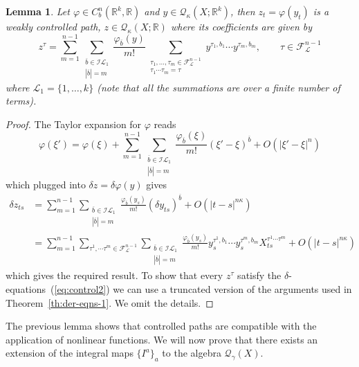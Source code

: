 \documentclass[a4paper,11pt,reqno]{article}
\newcommand{\ol}[1]{\overline{#1}}
\newcommand{\1}{{\bf 1}}
\newcommand{\II}{\mathcal{I}}
\newcommand{\der}{\delta}
\newcommand{\RR}{\mathbb{R}}
\newcommand{\FF}{\mathcal{F}}
\newcommand{\QQ}{\mathcal{Q}}
\newcommand{\LL}{\mathcal{L}}
\newcommand{\cl}{\mathcal L}
\newtheorem{lemma}[theorem]{Lemma}
\begin{document}
\begin{lemma}
\label{lemma:controlled-phi}
Let $\varphi \in C_b^n(\RR^k,\RR)$ and $y \in \QQ_\kappa(X;\RR^k)$, then $z_t
= \varphi(y_t)$ is a weakly controlled path, $z \in \QQ_\kappa(X;\RR)$ where its coefficients are given by
\begin{equation*}
z^\tau = \sum_{m = 1}^{n-1} \sum_{\substack{\ol b \in \II\LL_1 \\ |\ol b|=m}}\frac{\varphi_{\ol b}(y)}{m!}
\sum_{\substack{\tau_1,\dots,\tau_m \in \FF_\cl^{n-1}\\ 
    \tau_1\cdots\tau_m=\tau }} y^{\tau_1,b_1} \cdots y^{\tau_m,b_m} , \qquad \tau \in \FF_\LL^{n-1}  
\end{equation*}
where $\LL_1=\{1,\dots,k\}$
(note that all the summations are over a finite number of terms).
\end{lemma}
\begin{proof}
The Taylor expansion for $\varphi$ reads
$$
\varphi(\xi') = \varphi(\xi) + \sum_{m = 1}^{n-1} \sum_{\substack{\ol b \in \II\LL_1 \\ |\ol b|=m}}\frac{\varphi_{\ol b}(\xi)}{m!} (\xi'-\xi)^{\ol b} + O(|\xi'-\xi|^n)
$$ 
which plugged into $\der z = \der \varphi(y)$ gives
\begin{equation*}
  \begin{split}
 \der z_{ts} & =  \sum_{m = 1}^{n-1} \sum_{\substack{\ol b \in \II\LL_1 \\ |\ol b|=m}}\frac{\varphi_{\ol b}(y_s)}{m!} (\der y_{ts})^{\ol b} + O(|t-s|^{n\kappa})
\\ & =  \sum_{m = 1}^{n-1} \sum_{\tau^1,\cdots\tau^m \in \FF_\LL^{n-1}} \sum_{\substack{\ol b \in \II\LL_1 \\ |\ol b|=m}}\frac{\varphi_{\ol b}(y_s)}{m!} y^{\tau^1,b_1}_s\cdots y^{\tau^m,b_m}_s X^{\tau^1\cdots \tau^m}_{ts} + O(|t-s|^{n\kappa})
  \end{split}
\end{equation*}
which gives the required result. To show that every $z^\tau$ satisfy the $\der$-equations~(\ref{eq:control2}) we can use a truncated version of the  arguments used in  Theorem~\ref{th:der-eqns-1}. We omit the details.
\end{proof}

The previous lemma shows that controlled paths are compatible with the
application of nonlinear functions. We will now prove that there
exists an extension of the  integral maps $\{I^a\}_a$ to the algebra
$\QQ_\gamma(X)$.
\end{document}
